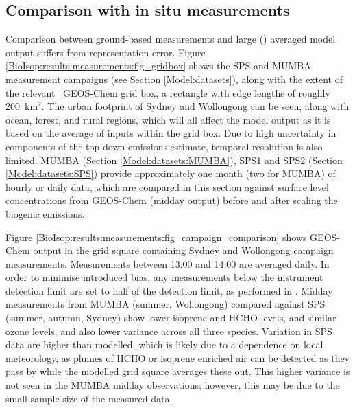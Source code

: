   
  \subsection{Comparison with in situ measurements}
    \label{BioIsop:results:measurements}
    
    Comparison between ground-based measurements and large (\lowhr) averaged model output suffers from representation error.
    Figure \ref{BioIsop:results:measurements:fig_gridbox} shows the SPS and MUMBA measurement campaigns (see Section \ref{Model:datasets}), along with the extent of the relevant \lowhr ~GEOS-Chem grid box, a rectangle with edge lengths of roughly 200~km$^{2}$.
    The urban footprint of Sydney and Wollongong can be seen, along with ocean, forest, and rural regions, which will all affect the model output as it is based on the average of inputs within the grid box.
    Due to high uncertainty in components of the top-down emissions estimate, temporal resolution is also limited.
    MUMBA (Section \ref{Model:datasets:MUMBA}), SPS1 and SPS2 (Section \ref{Model:datasets:SPS}) provide approximately one month (two for MUMBA) of hourly or daily data, which are compared in this section against surface level concentrations from GEOS-Chem (midday output) before and after scaling the biogenic emissions.
    
    
    
    Figure \ref{BioIsop:results:measurements:fig_campaign_comparison} shows GEOS-Chem output in the grid square containing Sydney and Wollongong campaign measurements.
    Measurements between 13:00 and 14:00 are averaged daily.
    In order to minimise introduced bias, any measurements below the instrument detection limit are set to half of the detection limit, as performed in \textcite{Lawson2015}. 
    Midday measurements from MUMBA (summer, Wollongong) compared against SPS (summer, autumn, Sydney) show lower isoprene and HCHO levels, and similar ozone levels, and also lower variance across all three species.
    Variation in SPS data are higher than modelled, which is likely due to a dependence on local meteorology, as plumes of HCHO or isoprene enriched air can be detected as they pass by while the modelled grid square averages these out.
    This higher variance is not seen in the MUMBA midday observations; however, this may be due to the small sample size of the measured data.
    
